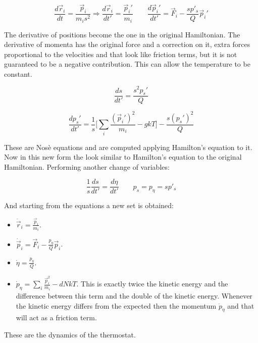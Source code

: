 	$$\frac{d\vec{r}_i}{dt} = \frac{\vec{p}_i}{m_is^2}\Rightarrow\frac{d\vec{r}_i}{dt'} = \frac{\vec{p}_i'}{m_i}\qquad \frac{d\vec{p}_i'}{dt'} = \vec{F}_i-\frac{sp'_s}{Q}\vec{p}_i'$$

	The derivative of positions become the one in the original Hamiltonian.
	The derivative of momenta has the original force and a correction on it, extra forces proportional to the velocities and that look like friction terms, but it is not guaranteed to be a negative contribution.
	This can allow the temperature to be constant.

	$$\frac{ds}{dt'} = \frac{s^2p_s'}{Q}$$

	$$\frac{dp_s'}{dt'} = \frac{1}{s}\biggl[\sum\limits_{i} \frac{(\vec{p}_i')^2}{m_i}-gkT\biggr] - \frac{s(p_s')^2}{Q}$$

	These are Nos\`e equations and are computed applying Hamilton's equation to it.
	Now in this new form the look similar to Hamilton's equation to the original Hamiltonian.
	Performing another change of variables:

	$$\frac{1}{s}\frac{ds}{dt'} = \frac{d\eta}{dt'}\qquad p_s = p_\eta = sp'_s$$

	And starting from the equations a new set is obtained:

	\begin{multicols}{2}
		\begin{itemize}
			\item $\dot{\vec{r}}_i = \frac{\vec{p}_i}{m_i}$.
			\item $\dot{\vec{p}}_i = \vec{F}_i-\frac{p_\eta}{Q}\vec{p}_i$.
			\item $\dot{\eta} = \frac{p_\eta}{Q}$.
			\item $\dot{p}_\eta = \sum\limits_{i}\frac{\vec{p}_i^2}{m_i}-dNkT$.
				This is exactly twice the kinetic energy and the difference between this term and the double of the kinetic energy.
				Whenever the kinetic energy differs from the expected then the momentum $\dot{p}_\eta$ and that will act as a friction term.
		\end{itemize}
	\end{multicols}

These are the dynamics of the thermostat.
